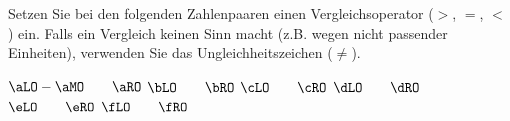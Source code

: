 Setzen Sie bei den folgenden Zahlenpaaren einen Vergleichsoperator ($>$, $=$, $<$) ein. Falls ein Vergleich keinen Sinn macht (z.B. wegen nicht passender Einheiten), verwenden Sie das Ungleichheitszeichen ($\neq$).

\begin{abcliste}
\abc $\aLO - \aMO \qquad \aRO$
\abc $\bLO \qquad \bRO$
\abc $\cLO \qquad \cRO$
\abc $\dLO \qquad \dRO$
\abc $\eLO \qquad \eRO$
\abc $\fLO \qquad \fRO$
\end{abcliste}
